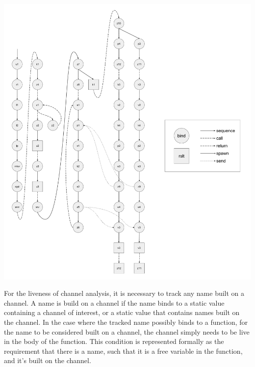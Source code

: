 \documentclass[letterpaper, 11pt]{extarticle}
\begin{document}
\includegraphics[width=1\textwidth]{cml-graph-lp.pdf}


For the liveness of channel analysis, it is necessary to track any name built on a channel.
A name is build on a channel if the name binds to a static value 
containing a channel of interest, or a static value that contains names built on the channel.
In the case where the tracked name possibly binds to a function,
for the name to be considered built on a channel,
the channel simply needs to be live in the body of the function.
This condition is represented formally as the requirement that there is a 
name, such that it is a free variable in the function, and it's built on the channel.
\end{document}
